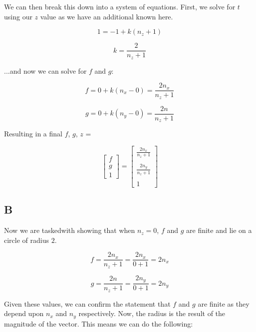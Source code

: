 \documentclass{article}
\begin{document}
\noindent We can then break this down into a system of equations. First, we solve for $t$ using our $z$ value as we have an additional known here.

\begin{equation}
    1 = -1 + k (n_z + 1)
\end{equation}

\begin{equation}
    k = \frac{2}{n_z+1}
\end{equation}

\noindent ...and now we can solve for $f$ and $g$:

\begin{equation}
    f = 0 + k (n_x-0) = \frac{2n_x}{n_z+1}
\end{equation}

\begin{equation}
    g = 0 + k(n_y-0) = \frac{2n}{n_z+1}
\end{equation}

\noindent Resulting in a final $f$, $g$, $z$ = 

\begin{equation}
    \begin{bmatrix}
        f \\ g \\ 1
    \end{bmatrix} = \begin{bmatrix}
        \frac{2n_x}{n_z+1} \\ \\ \frac{2n_y}{n_z+1} \\ \\ 1
    \end{bmatrix}
\end{equation}

\subsection*{B}

Now we are taskedwith showing that when $n_z = 0$, $f$ and $g$ are finite and lie on a circle of radius $2$.

\begin{equation}
    f = \frac{2n_x}{n_z+1} = \frac{2n_x}{0+1} = 2n_x
\end{equation}

\begin{equation}
    g = \frac{2n}{n_z+1} = \frac{2n_y}{0+1} = 2n_y
\end{equation}

\noindent Given these values, we can confirm the statement that $f$ and $g$ are finite as they depend upon $n_x$ and $n_y$ respectively. Now, the radius is the result of the magnitude of the vector. This means we can do the following:
\end{document}
